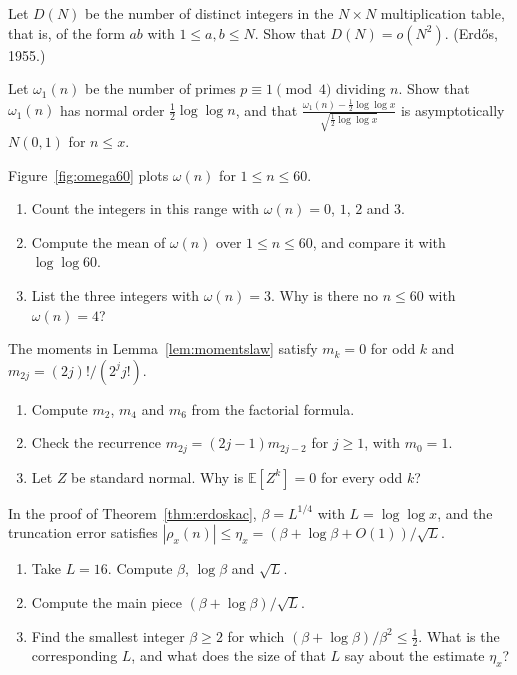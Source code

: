 \begin{exercise}\label{ex:multtable}
Let $D(N)$ be the number of distinct integers in the $N\times N$ multiplication table, that is, of the form $ab$ with $1\le a,b\le N$. Show that $D(N)=o(N^2)$. (Erd\H{o}s, 1955.)
\end{exercise}

\begin{exercise}[$\star\star\star$]\label{ex:omega1mod4}
Let $\omega_1(n)$ be the number of primes $p\equiv1\pmod4$ dividing $n$. Show that $\omega_1(n)$ has normal order $\frac12\log\log n$, and that $\frac{\omega_1(n)-\frac12\log\log x}{\sqrt{\frac12\log\log x}}$ is asymptotically $N(0,1)$
for $n\le x$.
\end{exercise}

\begin{exercise}[$\star$]\label{ex:omega60}
Figure~\ref{fig:omega60} plots $\omega(n)$ for $1\le n\le 60$.
\begin{enumerate}[label=(\alph*)]
\item Count the integers in this range with $\omega(n)=0$, $1$, $2$ and $3$.
\item Compute the mean of $\omega(n)$ over $1\le n\le 60$, and compare it with $\log\log 60$.
\item List the three integers with $\omega(n)=3$. Why is there no $n\le 60$ with $\omega(n)=4$?
\end{enumerate}
\end{exercise}

\begin{exercise}[$\star\star$]\label{ex:momentcheck}
The moments in Lemma~\ref{lem:momentslaw} satisfy $m_k=0$ for odd $k$ and $m_{2j}=(2j)!/(2^j j!)$.
\begin{enumerate}[label=(\alph*)]
\item Compute $m_2$, $m_4$ and $m_6$ from the factorial formula.
\item Check the recurrence $m_{2j}=(2j-1)m_{2j-2}$ for $j\ge1$, with $m_0=1$.
\item Let $Z$ be standard normal. Why is $\mathbb E[Z^k]=0$ for every odd $k$?
\end{enumerate}
\end{exercise}

\begin{exercise}[$\star\star$]\label{ex:cutoff16}
In the proof of Theorem~\ref{thm:erdoskac}, $\beta=L^{1/4}$ with $L=\log\log x$, and the truncation error satisfies $|\rho_x(n)|\le\eta_x=(\beta+\log\beta+O(1))/\sqrt L$.
\begin{enumerate}[label=(\alph*)]
\item Take $L=16$. Compute $\beta$, $\log\beta$ and $\sqrt L$.
\item Compute the main piece $(\beta+\log\beta)/\sqrt L$.
\item Find the smallest integer $\beta\ge 2$ for which $(\beta+\log\beta)/\beta^2\le\frac12$. What is the corresponding $L$, and what does the size of that $L$ say about the estimate $\eta_x$?
\end{enumerate}
\end{exercise}

